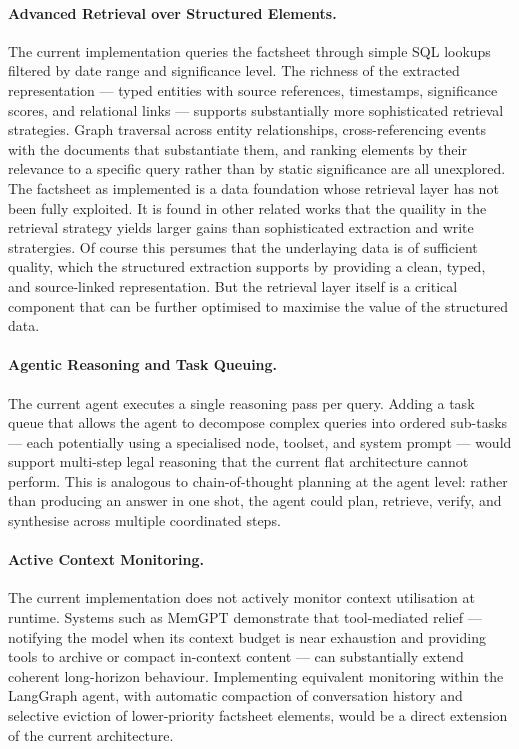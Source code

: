 \paragraph{Advanced Retrieval over Structured Elements.}
The current implementation queries the factsheet through simple SQL lookups filtered by date range and significance level. The richness of the extracted representation --- typed entities with source references, timestamps, significance scores, and relational links --- supports substantially more sophisticated retrieval strategies. Graph traversal across entity relationships, cross-referencing events with the documents that substantiate them, and ranking elements by their relevance to a specific query rather than by static significance are all unexplored. The factsheet as implemented is a data foundation whose retrieval layer has not been fully exploited.
It is found in other related works that the quaility in the retrieval strategy yields larger gains than sophisticated extraction and write stratergies. \cite{yuan2026diagnosingretrievalvsutilization}
Of course this persumes that the underlaying data is of sufficient quality, which the structured extraction supports by providing a clean, typed, and source-linked representation. But the retrieval layer itself is a critical component that can be further optimised to maximise the value of the structured data.

\paragraph{Agentic Reasoning and Task Queuing.}
The current agent executes a single reasoning pass per query. Adding a task queue that allows the agent to decompose complex queries into ordered sub-tasks --- each potentially using a specialised node, toolset, and system prompt --- would support multi-step legal reasoning that the current flat architecture cannot perform. This is analogous to chain-of-thought planning at the agent level: rather than producing an answer in one shot, the agent could plan, retrieve, verify, and synthesise across multiple coordinated steps.

\paragraph{Active Context Monitoring.}
The current implementation does not actively monitor context utilisation at runtime.
Systems such as MemGPT \cite{packer2024memgptllmsoperatingsystems} demonstrate that
tool-mediated relief --- notifying the model when its context budget is near exhaustion
and providing tools to archive or compact in-context content --- can substantially extend
coherent long-horizon behaviour. Implementing equivalent monitoring within the LangGraph
agent, with automatic compaction of conversation history and selective eviction of
lower-priority factsheet elements, would be a direct extension of the current
architecture.

